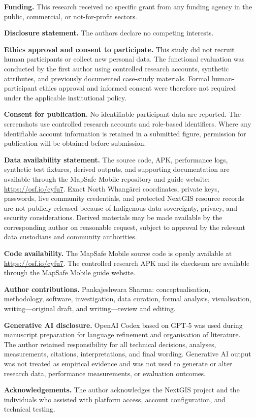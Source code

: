 \documentclass[]{interact}
\begin{document}
\noindent\textbf{Funding.}
This research received no specific grant from any funding agency in the
public, commercial, or not-for-profit sectors.

\medskip
\noindent\textbf{Disclosure statement.}
The authors declare no competing interests.

\medskip
\noindent\textbf{Ethics approval and consent to participate.}
This study did not recruit human participants or collect new personal data.
The functional evaluation was conducted by the first author using controlled
research accounts, synthetic attributes, and previously documented case-study
materials. Formal human-participant ethics approval and informed consent were
therefore not required under the applicable institutional policy.

\medskip
\noindent\textbf{Consent for publication.}
No identifiable participant data are reported. The screenshots use controlled
research accounts and role-based identifiers. Where any identifiable account
information is retained in a submitted figure, permission for publication will
be obtained before submission.

\medskip
\noindent\textbf{Data availability statement.}
The source code, APK, performance logs, synthetic test fixtures, derived
outputs, and supporting documentation are available through the MapSafe Mobile
repository and guide website:
\url{https://osf.io/cyfu7}. 
Exact North Whangārei coordinates, private keys, passwords, live community
credentials, and protected NextGIS resource records are not publicly released
because of Indigenous data-sovereignty, privacy, and security considerations.
Derived materials may be made available by the corresponding author on
reasonable request, subject to approval by the relevant data custodians and
community authorities.

\medskip
\noindent\textbf{Code availability.}
The MapSafe Mobile source code is openly available at
\url{https://osf.io/cyfu7}.
The controlled research APK and its checksum are available through the
MapSafe Mobile guide website.

\medskip
\noindent\textbf{Author contributions.}
Pankajeshwara Sharma: conceptualisation, methodology, software, investigation,
data curation, formal analysis, visualisation, writing---original draft, and
writing---review and editing.

\medskip
\noindent\textbf{Generative AI disclosure.}
OpenAI Codex based on GPT-5 was used during manuscript preparation for language
refinement and organisation of literature. The author retained responsibility for all
technical decisions, analyses, measurements, citations, interpretations, and
final wording. Generative AI output was not treated as empirical evidence and
was not used to generate or alter research data, performance measurements, or
evaluation outcomes.

\medskip
\noindent\textbf{Acknowledgements.}
The author acknowledges the NextGIS project and the individuals who assisted
with platform access, account configuration, and technical testing.

\clearpage

\end{document}
